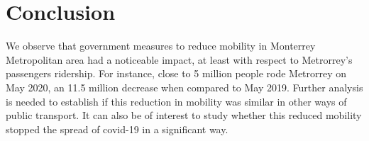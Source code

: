 \documentclass[letterpaper, 10 pt, conference]{article}
\begin{document}
\section*{Conclusion}
We observe that government measures to reduce mobility in Monterrey Metropolitan area had a noticeable impact, at least with respect to Metrorrey's passengers ridership. For instance, close to 5 million people rode Metrorrey on May 2020, an 11.5 million decrease when compared to May 2019. Further analysis is needed to establish if this reduction in mobility was similar in other ways of public transport. It can also be of interest to study whether this reduced mobility stopped the spread of covid-19 in a significant way. 






\end{document}
